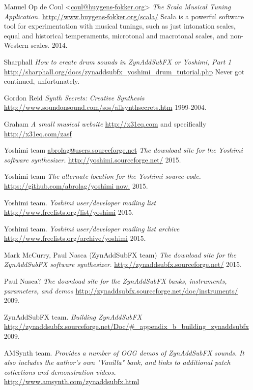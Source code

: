 \begin{thebibliography}{99}
   Manuel Op de Coul <\url{coul@huygens-fokker.org}>
   \emph{The Scala Musical Tuning Application.}
   \url{http://www.huygens-fokker.org/scala/}
   Scala is a powerful software tool for experimentation with musical
   tunings, such as just intonation scales, equal and historical
   temperaments, microtonal and macrotonal scales, and non-Western scales.
   2014.

   Sharphall
   \emph{How to create drum sounds in ZynAddSubFX or Yoshimi, Part 1}
   \url{http://sharphall.org/docs/zynaddsubfx\_yoshimi\_drum\_tutorial.php}
   Never got continued, unfortunately.

   Gordon Reid
   \emph{Synth Secrets:  Creative Synthesis}
   \url{http://www.soundonsound.com/sos/allsynthsecrets.htm}
   1999-2004.

   Graham
   \emph{A small musical website}
   \url{http://x31eq.com} and specifically
   \url{http://x31eq.com/zasf}

   Yoshimi team \url{abrolag@users.sourceforge.net}
   \emph{The download site for the Yoshimi software synthesizer.}
   \url{http://yoshimi.sourceforge.net/}
   2015.

   Yoshimi team
   \emph{The alternate location for the Yoshimi source-code.}
   \url{https://github.com/abrolag/yoshimi now.}
   2015.

   Yoshimi team.
   \emph{Yoshimi user/developer mailing list}
   \url{http://www.freelists.org/list/yoshimi}
   2015.

   Yoshimi team.
   \emph{Yoshimi user/developer mailing list archive}
   \url{http://www.freelists.org/archive/yoshimi}
   2015.

   Mark McCurry, Paul Nasca (ZynAddSubFX team)
   \emph{The download site for the ZynAddSubFX software synthesizer.}
   \url{http://zynaddsubfx.sourceforge.net/}
   2015.

   Paul Nasca?
   \emph{The download site for the ZynAddSubFX banks, instruments,
      parameters, and demos}
   \url{http://zynaddsubfx.sourceforge.net/doc/instruments/}
   2009.

   ZynAddSubFX team.
   \emph{Building ZynAddSubFX}
   \url{http://zynaddsubfx.sourceforge.net/Doc/#_appendix_b_building_zynaddsubfx}
   2009.

   AMSynth team.
   \emph{Provides a number of OGG demos of ZynAddSubFX sounds. It
   also includes the author's own "Vanilla" bank, and links to additional
   patch collections and demonstration videos.}
   \url{http://www.amsynth.com/zynaddsubfx.html}


\end{thebibliography}
